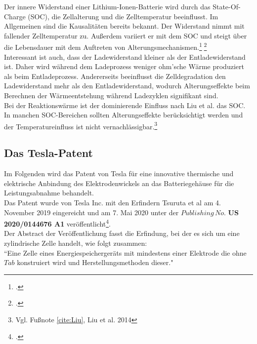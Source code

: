 Der innere Widerstand einer Lithium-Ionen-Batterie wird durch das State-Of-Charge (SOC), die Zellalterung und die Zelltemperatur beeinflusst. Im Allgemeinen sind die Kausalitäten bereits bekannt. Der Widerstand nimmt mit fallender Zelltemperatur zu. Außerdem variiert er mit dem SOC und steigt über die Lebensdauer mit dem Auftreten von Alterungsmechanismen.\footcite[Vgl.][]{Andre.2011}$\;$\footcite[Vgl.][]{Ecker.2012}\\
Interessant ist auch, dass der Ladewiderstand kleiner als der Entladewiderstand ist. Daher wird während dem Ladeprozess weniger ohm'sche Wärme produziert als beim Entladeprozess. Andererseits beeinflusst die Zelldegradation den Ladewiderstand mehr als den Entladewiderstand, wodurch Alterungseffekte beim Berechnen der Wärmeentstehung während Ladezyklen signifikant sind.\\
Bei der Reaktionswärme ist der dominierende Einfluss nach Liu et al. das SOC. In manchen SOC-Bereichen sollten Alterungseffekte berücksichtigt werden und der Temperatureinfluss ist nicht vernachlässigbar.\footnote{Vgl. Fußnote \ref{cite:Liu}, Liu et al. 2014}

\newpage
\subsection{Das Tesla-Patent}

Im Folgenden wird das Patent von Tesla für eine innovative thermische und elektrische Anbindung des Elektrodenwickels an das Batteriegehäuse für die Leistungsabnahme behandelt.\\
Das Patent wurde von Tesla Inc. mit den Erfindern Tsuruta et al am 4. November 2019 eingereicht und am 7. Mai 2020 unter der $Publishing\,No.$ \textbf{US 2020/0144676 A1} veröffentlicht\footcite[Vgl.\label{cite:TeslaPatent}][]{TsurutaTesla2020}.\\
Der Abstract der Veröffentlichung fasst die Erfindung, bei der es sich um eine zylindrische Zelle handelt, wie folgt zusammen: \\
``Eine Zelle eines Energiespeichergeräts mit mindestens einer Elektrode die ohne $Tab$ konstruiert wird und Herstellungsmethoden dieser."\\

